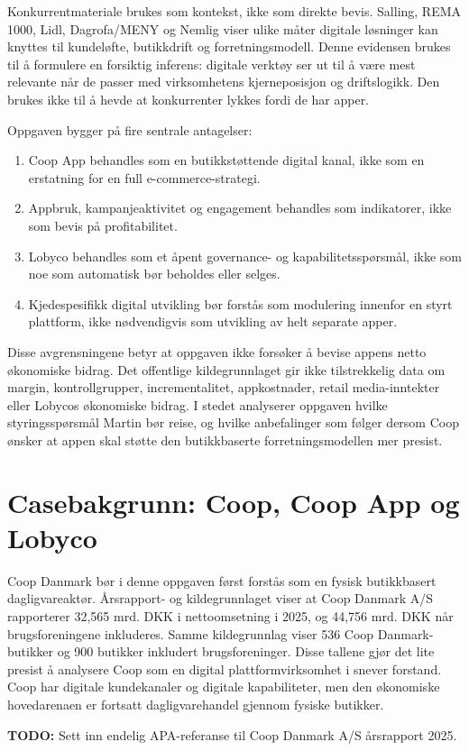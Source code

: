 \documentclass[12pt,a4paper]{article}
\newcommand{\todo}[1]{\par\noindent\textcolor{red!70!black}{\textbf{TODO:} #1}\par}
\begin{document}
Konkurrentmateriale brukes som kontekst, ikke som direkte bevis. Salling, REMA 1000, Lidl, Dagrofa/MENY og Nemlig viser ulike måter digitale løsninger kan knyttes til kundeløfte, butikkdrift og forretningsmodell. Denne evidensen brukes til å formulere en forsiktig inferens: digitale verktøy ser ut til å være mest relevante når de passer med virksomhetens kjerneposisjon og driftslogikk. Den brukes ikke til å hevde at konkurrenter lykkes fordi de har apper.

Oppgaven bygger på fire sentrale antagelser:

\begin{enumerate}
  \item Coop App behandles som en butikkstøttende digital kanal, ikke som en erstatning for en full e-commerce-strategi.
  \item Appbruk, kampanjeaktivitet og engagement behandles som indikatorer, ikke som bevis på profitabilitet.
  \item Lobyco behandles som et åpent governance- og kapabilitetsspørsmål, ikke som noe som automatisk bør beholdes eller selges.
  \item Kjedespesifikk digital utvikling bør forstås som modulering innenfor en styrt plattform, ikke nødvendigvis som utvikling av helt separate apper.
\end{enumerate}

Disse avgrensningene betyr at oppgaven ikke forsøker å bevise appens netto økonomiske bidrag. Det offentlige kildegrunnlaget gir ikke tilstrekkelig data om margin, kontrollgrupper, incrementalitet, appkostnader, retail media-inntekter eller Lobycos økonomiske bidrag. I stedet analyserer oppgaven hvilke styringsspørsmål Martin bør reise, og hvilke anbefalinger som følger dersom Coop ønsker at appen skal støtte den butikkbaserte forretningsmodellen mer presist.

\section{Casebakgrunn: Coop, Coop App og Lobyco}

Coop Danmark bør i denne oppgaven først forstås som en fysisk butikkbasert dagligvareaktør. Årsrapport- og kildegrunnlaget viser at Coop Danmark A/S rapporterer 32,565 mrd. DKK i nettoomsetning i 2025, og 44,756 mrd. DKK når brugsforeningene inkluderes. Samme kildegrunnlag viser 536 Coop Danmark-butikker og 900 butikker inkludert brugsforeninger. Disse tallene gjør det lite presist å analysere Coop som en digital plattformvirksomhet i snever forstand. Coop har digitale kundekanaler og digitale kapabiliteter, men den økonomiske hovedarenaen er fortsatt dagligvarehandel gjennom fysiske butikker. \todo{Sett inn endelig APA-referanse til Coop Danmark A/S årsrapport 2025.}
\end{document}
